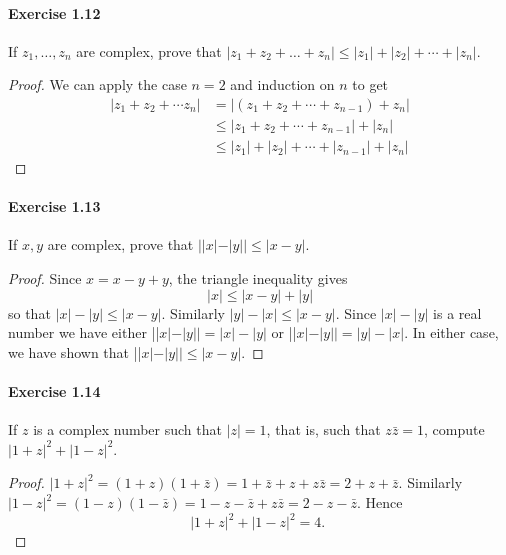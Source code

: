\documentclass{article}
\theoremstyle{definition}
\begin{document}
\paragraph{Exercise 1.12} If $z_1, \ldots, z_n$ are complex, prove that $|z_1 + z_2 + \ldots + z_n| \leq |z_1| + |z_2| + \cdots + |z_n|$.
\begin{proof}
    We can apply the case $n=2$ and induction on $n$ to get
$$
\begin{aligned}
\left|z_1+z_2+\cdots z_n\right| &=\left|\left(z_1+z_2+\cdots+z_{n-1}\right)+z_n\right| \\
& \leq\left|z_1+z_2+\cdots+z_{n-1}\right|+\left|z_n\right| \\
& \leq\left|z_1\right|+\left|z_2\right|+\cdots+\left|z_{n-1}\right|+\left|z_n\right|
\end{aligned}
$$
\end{proof}



\paragraph{Exercise 1.13} If $x, y$ are complex, prove that $||x|-|y|| \leq |x-y|$.
\begin{proof}
    Since $x=x-y+y$, the triangle inequality gives
$$
|x| \leq|x-y|+|y|
$$
so that $|x|-|y| \leq|x-y|$. Similarly $|y|-|x| \leq|x-y|$. Since $|x|-|y|$ is a real number we have either ||$x|-| y||=|x|-|y|$ or ||$x|-| y||=|y|-|x|$. In either case, we have shown that ||$x|-| y|| \leq|x-y|$.
\end{proof}



\paragraph{Exercise 1.14} If $z$ is a complex number such that $|z|=1$, that is, such that $z \bar{z}=1$, compute $|1+z|^{2}+|1-z|^{2}$.
\begin{proof}
    $|1+z|^2=(1+z)(1+\bar{z})=1+\bar{z}+z+z \bar{z}=2+z+\bar{z}$. Similarly $|1-z|^2=(1-z)(1-\bar{z})=1-z-\bar{z}+z \bar{z}=2-z-\bar{z}$. Hence
$$
|1+z|^2+|1-z|^2=4 \text {. }
$$
\end{proof}
\end{document}
